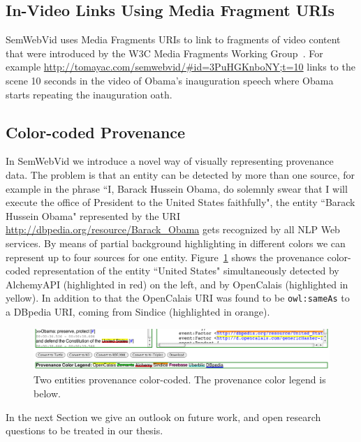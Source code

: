 \documentclass[12pt]{article}
\begin{document}
\subsection{In-Video Links Using Media Fragment URIs}
SemWebVid uses Media Fragments URIs to link to fragments of video content that were introduced by the W3C Media Fragments Working Group~\cite{W3C:MediaFrags}. For example \url{http://tomayac.com/semwebvid/#id=3PuHGKnboNY;t=10} links to the scene 10 seconds in the video of Obama's inauguration speech where Obama starts repeating the inauguration oath.

\subsection{Color-coded Provenance}\label{sec:provenance}
In SemWebVid we introduce a novel way of visually representing provenance data. The problem is that an entity can be detected by more than one source, for example in the phrase ``I, Barack Hussein Obama, do solemnly swear that I will execute the office of President to the United States faithfully", the entity ``Barack Hussein Obama" represented by the URI \url{http://dbpedia.org/resource/Barack_Obama} gets recognized by all NLP Web services. By means of partial background highlighting in different colors we can represent up to four sources for one entity. Figure~\ref{fig:provenance} shows the provenance color-coded representation of the entity ``United States" simultaneously detected by AlchemyAPI (highlighted in red) on the left, and by OpenCalais (highlighted in yellow). In addition to that the OpenCalais URI was found to be \texttt{owl:sameAs} to a DBpedia URI, coming from Sindice (highlighted in orange).

\begin{figure}[htbp!]
\begin{center}
  \includegraphics[width=\linewidth]{./resources/semwebvid-provenance.png}
    \caption[Two entities provenance color-coded.]{Two entities provenance color-coded. The provenance color legend is below.}
  \label{fig:provenance}
  \end{center}  
\end{figure}

In the next Section we give an outlook on future work, and open research questions to be treated in our thesis.
\end{document}
